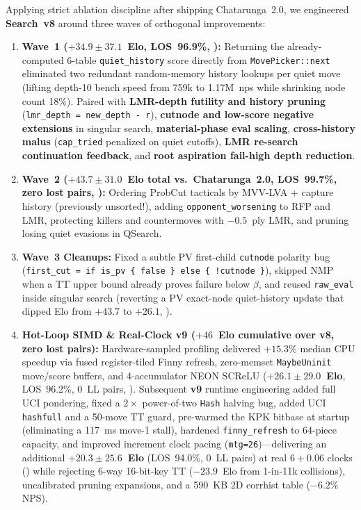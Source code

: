\documentclass[10.5pt,letterpaper]{article}
\begin{document}
Applying strict ablation discipline after shipping Chatarunga~2.0, we engineered \textbf{Search~v8} around three waves of orthogonal improvements:
\begin{enumerate}
    \item \textbf{Wave~1 ($+34.9 \pm 37.1$~Elo, LOS~96.9\%, ):} Returning the already-computed 6-table \texttt{quiet\_history} score directly from \texttt{MovePicker::next} eliminated two redundant random-memory history lookups per quiet move (lifting depth-10 bench speed from 759k to 1.17M~nps while shrinking node count 18\%). Paired with \textbf{LMR-depth futility and history pruning} (\texttt{lmr\_depth = new\_depth - r}), \textbf{cutnode and low-score negative extensions} in singular search, \textbf{material-phase eval scaling}, \textbf{cross-history malus} (\texttt{cap\_tried} penalized on quiet cutoffs), \textbf{LMR re-search continuation feedback}, and \textbf{root aspiration fail-high depth reduction}.
    \item \textbf{Wave~2 ($+43.7 \pm 31.0$~Elo total vs.\ Chatarunga~2.0, LOS~99.7\%, zero lost pairs, ):} Ordering ProbCut tacticals by MVV-LVA + capture history (previously unsorted!), adding \texttt{opponent\_worsening} to RFP and LMR, protecting killers and countermoves with $-0.5$~ply LMR, and pruning losing quiet evasions in QSearch.
    \item \textbf{Wave~3 Cleanups:} Fixed a subtle PV first-child \texttt{cutnode} polarity bug (\texttt{first\_cut = if is\_pv \{ false \} else \{ !cutnode \}}), skipped NMP when a TT upper bound already proves failure below $\beta$, and reused \texttt{raw\_eval} inside singular search (reverting a PV exact-node quiet-history update that dipped Elo from $+43.7$ to $+26.1$, ).
    \item \textbf{Hot-Loop SIMD \& Real-Clock v9 ($+46$~Elo cumulative over v8, zero lost pairs):} Hardware-sampled profiling delivered $+15.3\%$ median CPU speedup via fused register-tiled Finny refresh, zero-memset \texttt{MaybeUninit} move/score buffers, and 4-accumulator NEON SCReLU (\textbf{$+26.1 \pm 29.0$~Elo}, LOS~96.2\%, 0~LL pairs, ). Subsequent \textbf{v9} runtime engineering added full UCI pondering, fixed a $2\times$ power-of-two \texttt{Hash} halving bug, added UCI \texttt{hashfull} and a 50-move TT guard, pre-warmed the KPK bitbase at startup (eliminating a 117~ms move-1 stall), hardened \texttt{finny\_refresh} to 64-piece capacity, and improved increment clock pacing (\texttt{mtg=26})—delivering an additional \textbf{$+20.3 \pm 25.6$~Elo} (LOS~94.0\%, 0~LL pairs) at real $6+0.06$ clocks () while rejecting 6-way 16-bit-key TT ($-23.9$~Elo from 1-in-11k collisions), uncalibrated pruning expansions, and a 590~KB 2D corrhist table ($-6.2\%$ NPS).
\end{enumerate}
\end{document}
